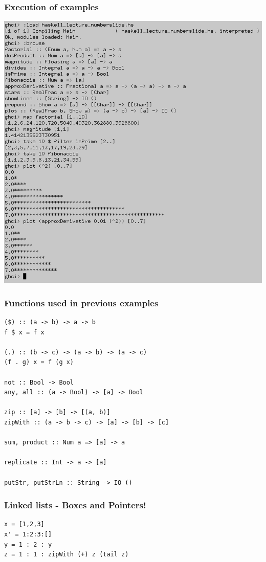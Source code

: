 \documentclass{beamer}
\begin{document}
\begin{frame}[fragile]
\frametitle{Execution of examples}
\includegraphics[scale=0.25]{haskell_lecture_numberslide_ghci1_cropped.png}
\end{frame}

\begin{frame}[fragile]
\frametitle{Functions used in previous examples}
\begin{Verbatim}[frame=single, fontsize=\scriptsize]
($) :: (a -> b) -> a -> b
f $ x = f x

(.) :: (b -> c) -> (a -> b) -> (a -> c)
(f . g) x = f (g x)

not :: Bool -> Bool
any, all :: (a -> Bool) -> [a] -> Bool

zip :: [a] -> [b] -> [(a, b)]
zipWith :: (a -> b -> c) -> [a] -> [b] -> [c]

sum, product :: Num a => [a] -> a

replicate :: Int -> a -> [a]

putStr, putStrLn :: String -> IO ()
\end{Verbatim}
\end{frame}

\begin{frame}[fragile]
\frametitle{Linked lists - Boxes and Pointers!}
\begin{Verbatim}[frame=single, fontsize=\scriptsize]
x = [1,2,3]
x' = 1:2:3:[]
y = 1 : 2 : y
z = 1 : 1 : zipWith (+) z (tail z)
\end{Verbatim}
\end{frame}
\end{document}
